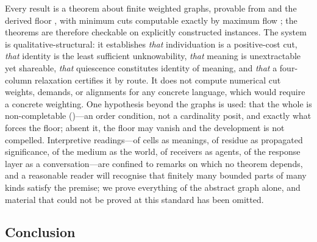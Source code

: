 \documentclass[twocolumn,11pt,a4paper]{article}
\theoremstyle{sup}
\theoremstyle{definition}
\theoremstyle{remark}
\begin{document}
Every result is a theorem about finite weighted graphs, provable from
 and the derived floor , with minimum cuts
computable exactly by maximum flow \citep{fordfulkerson1956,menger1927}; the
theorems are therefore checkable on explicitly constructed instances. The system
is qualitative-structural: it establishes \emph{that} individuation is a
positive-cost cut, \emph{that} identity is the least sufficient unknowability,
\emph{that} meaning is unextractable yet shareable, \emph{that} quiescence
constitutes identity of meaning, and \emph{that} a four-column relaxation
certifies it by route. It does not compute numerical cut weights, demands, or
alignments for any concrete language, which would require a concrete weighting.
One hypothesis beyond the graphs is used: that the whole is non-completable
()---an order condition, not a cardinality posit, and
exactly what forces the floor; absent it, the floor may vanish and the
development is not compelled. Interpretive readings---of cells as meanings, of
residue as propagated significance, of the medium as the world, of receivers as
agents, of the response layer as a conversation---are confined to remarks on
which no theorem depends, and a reasonable reader will recognise that finitely
many bounded parts of many kinds satisfy the premise; we prove everything of the
abstract graph alone, and material that could not be proved at this standard has
been omitted.

\subsection{Conclusion}
\end{document}
